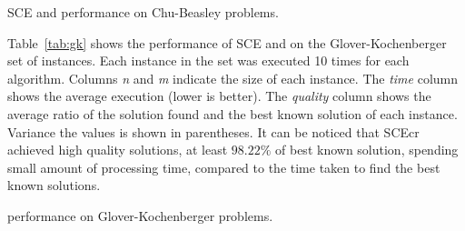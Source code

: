 \begin{table}
 \caption{SCE and \scecore  performance on Chu-Beasley problems.}
{
\renewcommand{\arraystretch}{0.9}%
\fontsize{7.0pt}{1.2em}\selectfont 
\begin{center}
  
\end{center}
}
 \label{tab:chu}
\end{table}

Table~\ref{tab:gk} shows the performance of SCE and \scecore on the Glover-Kochenberger set of instances.
Each instance in the set was executed 10 times for each algorithm.
Columns \textit{n} and \textit{m} indicate the size of each instance.
The \textit{time} column shows the average execution (lower is better).
The \textit{quality} column shows the average ratio of the solution found and
the best known solution of each instance.
Variance the values is shown in parentheses.
It can be noticed that SCEcr achieved high quality solutions, at least $98.22\%$
of best known solution, spending small amount of processing time, compared
to the time taken to find the best known solutions.

\begin{table}
 \caption{\scecore performance on Glover-Kochenberger problems.}
{
\renewcommand{\arraystretch}{1.5}%
\fontsize{7.3pt}{1em}\selectfont 
\begin{center}
\end{center}
  
}
 \label{tab:gk}
\end{table}

